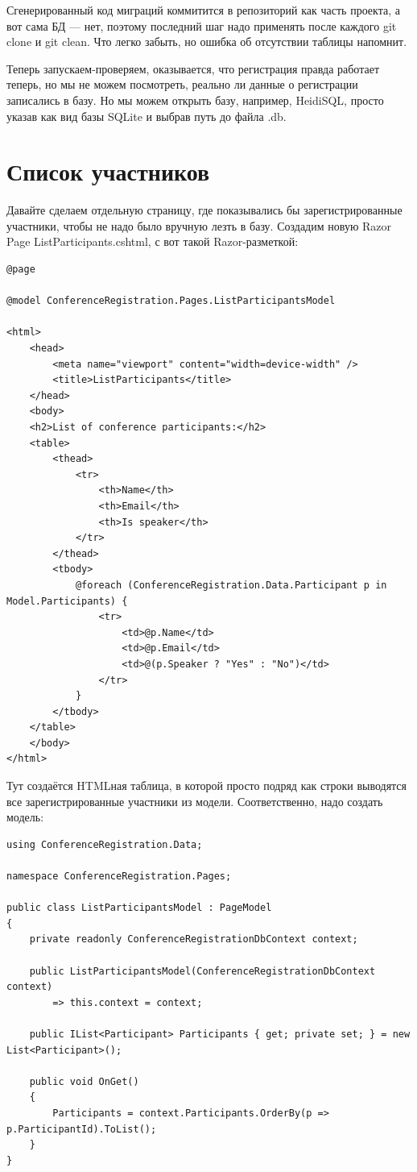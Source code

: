 \documentclass[a5paper]{article}
\begin{document}
Сгенерированный код миграций коммитится в репозиторий как часть проекта, а вот сама БД --- нет, поэтому последний шаг надо применять после каждого git clone и git clean. Что легко забыть, но ошибка об отсутствии таблицы напомнит.

Теперь запускаем-проверяем, оказывается, что регистрация правда работает теперь, но мы не можем посмотреть, реально ли данные о регистрации записались в базу. Но мы можем открыть базу, например, HeidiSQL, просто указав как вид базы SQLite и выбрав путь до файла .db. 

\section{Список участников}

Давайте сделаем отдельную страницу, где показывались бы зарегистрированные участники, чтобы не надо было вручную лезть в базу. Создадим новую Razor Page ListParticipants.cshtml, с вот такой Razor-разметкой:

\begin{verbatim}
@page

@model ConferenceRegistration.Pages.ListParticipantsModel

<html>
    <head>
        <meta name="viewport" content="width=device-width" />
        <title>ListParticipants</title>
    </head>
    <body>
    <h2>List of conference participants:</h2>
    <table>
        <thead>
            <tr>
                <th>Name</th>
                <th>Email</th>
                <th>Is speaker</th>
            </tr>
        </thead>
        <tbody>
            @foreach (ConferenceRegistration.Data.Participant p in Model.Participants) {
                <tr>
                    <td>@p.Name</td>
                    <td>@p.Email</td>
                    <td>@(p.Speaker ? "Yes" : "No")</td>
                </tr>
            }
        </tbody>
    </table>
    </body>
</html>
\end{verbatim}

Тут создаётся HTMLная таблица, в которой просто подряд как строки выводятся все зарегистрированные участники из модели. Соответственно, надо создать модель:

\begin{verbatim}
using ConferenceRegistration.Data;

namespace ConferenceRegistration.Pages;

public class ListParticipantsModel : PageModel
{
    private readonly ConferenceRegistrationDbContext context;

    public ListParticipantsModel(ConferenceRegistrationDbContext context)
        => this.context = context;

    public IList<Participant> Participants { get; private set; } = new List<Participant>();

    public void OnGet()
    {
        Participants = context.Participants.OrderBy(p => p.ParticipantId).ToList();
    }
}
\end{verbatim}
\end{document}
